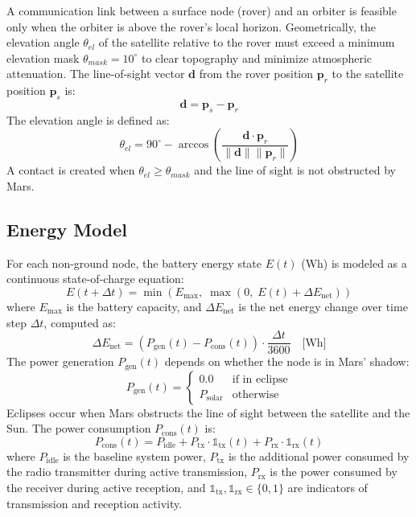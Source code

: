 \documentclass[journal,twocolumn]{IEEEtran}
\begin{document}
A communication link between a surface node (rover) and an orbiter is feasible only when the orbiter is above the rover's local horizon. Geometrically, the elevation angle $\theta_{el}$ of the satellite relative to the rover must exceed a minimum elevation mask $\theta_{mask} = 10^\circ$ to clear topography and minimize atmospheric attenuation. The line-of-sight vector $\mathbf{d}$ from the rover position $\mathbf{p}_r$ to the satellite position $\mathbf{p}_s$ is:
\begin{equation}
    \mathbf{d} = \mathbf{p}_s - \mathbf{p}_r
\end{equation}
The elevation angle is defined as:
\begin{equation}
    \theta_{el} = 90^\circ - \arccos\left(\frac{\mathbf{d} \cdot \mathbf{p}_r}{\|\mathbf{d}\| \|\mathbf{p}_r\|}\right)
\end{equation}
A contact is created when $\theta_{el} \geq \theta_{mask}$ and the line of sight is not obstructed by Mars.

\subsection{Energy Model}
For each non-ground node, the battery energy state $E(t)$ (Wh) is modeled as a continuous state-of-charge equation:
\begin{equation}
    E(t + \Delta t) = \min\left(E_{\max},\; \max\left(0,\; E(t) + \Delta E_{\text{net}}\right)\right)
\end{equation}
where $E_{\max}$ is the battery capacity, and $\Delta E_{\text{net}}$ is the net energy change over time step $\Delta t$, computed as:
\begin{equation}
    \Delta E_{\text{net}} = \left(P_{\text{gen}}(t) - P_{\text{cons}}(t)\right) \cdot \frac{\Delta t}{3600} \quad \text{[Wh]}
\end{equation}
The power generation $P_{\text{gen}}(t)$ depends on whether the node is in Mars' shadow:
\begin{equation}
    P_{\text{gen}}(t) = \begin{cases}
        0.0 & \text{if in eclipse} \\
        P_{\text{solar}} & \text{otherwise}
    \end{cases}
\end{equation}
Eclipses occur when Mars obstructs the line of sight between the satellite and the Sun. The power consumption $P_{\text{cons}}(t)$ is:
\begin{equation}
    P_{\text{cons}}(t) = P_{\text{idle}} + P_{\text{tx}} \cdot \mathbb{1}_{\text{tx}}(t) + P_{\text{rx}} \cdot \mathbb{1}_{\text{rx}}(t)
\end{equation}
where $P_{\text{idle}}$ is the baseline system power, $P_{\text{tx}}$ is the additional power consumed by the radio transmitter during active transmission, $P_{\text{rx}}$ is the power consumed by the receiver during active reception, and $\mathbb{1}_{\text{tx}}, \mathbb{1}_{\text{rx}} \in \{0, 1\}$ are indicators of transmission and reception activity.
\end{document}
